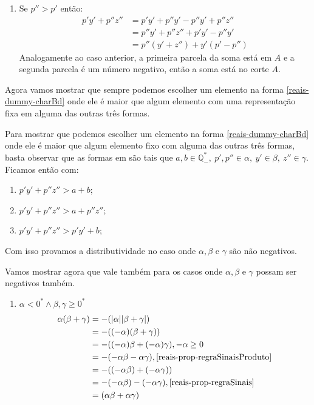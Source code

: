 \documentclass[../main.tex]{subfiles}
\begin{document}
\begin{dem}
\begin{enumerate}
        \item Se $p'' > p'$ então:
            \begin{align}
                p'y' + p''z'' &= p'y' + p''y' - p''y' + p''z'' \\
                &= p''y' + p''z'' + p'y' - p''y' \\
                &= p''(y'+z'') + y'(p'-p'')
            \end{align}
            Analogamente ao caso anterior, a primeira parcela da soma está em $A$ e a segunda parcela é um número negativo, então a soma está no corte $A$.
    \end{enumerate}
    Agora vamos mostrar que sempre podemos escolher um elemento na forma \ref{reais-dummy-charBd} onde ele é maior que algum elemento com uma representação fixa em alguma das outras três formas.
    
    Para mostrar que podemos escolher um elemento na forma \ref{reais-dummy-charBd} onde ele é maior que algum elemento fixo com alguma das outras três formas, basta observar que as formas em  são tais que $a, b \in \mathbb{Q}_{-}^*,\ p',p'' \in \alpha,\ y' \in \beta,\ z'' \in \gamma$. Ficamos então com:

      \begin{enumerate}[label=(\roman*)]\label{reais-dummy-charBFormas}
        \item\label{reais-dummy-charBa} $p'y' + p''z'' > a + b $; 
        \item\label{reais-dummy-charBb} $p'y' + p''z'' > a + p''z''$; 
        \item\label{reais-dummy-charBc} $p'y' + p''z'' > p'y' + b$; 
    \end{enumerate}

    Com isso provamos a distributividade no caso onde $\alpha, \beta$ e $\gamma$ são não negativos.

    Vamos mostrar agora que vale também para os casos onde $\alpha, \beta$ e $\gamma$ possam ser negativos também.

    \begin{enumerate}
        \item 
            $\alpha < 0^* \land \beta, \gamma \geq 0^*$ 
            \begin{align*}
                \alpha (\beta + \gamma) &= -(\abs{\alpha}\abs{\beta+\gamma}) \\
                &= -((-\alpha)(\beta+\gamma)) \\
                &= -((-\alpha)\beta + (-\alpha)\gamma) , -\alpha \geq 0 \\
                &= - (-\alpha\beta - \alpha\gamma), \text{\Cref{reais-prop-regraSinaisProduto}} \\
                &= - ((-\alpha\beta) + (-\alpha\gamma)) \\
                &= - (-\alpha\beta) - (-\alpha\gamma), \text{\Cref{reais-prop-regraSinais}} \\
                &= (\alpha\beta + \alpha\gamma)
            \end{align*}


\end{enumerate}
\end{dem}
\end{document}
